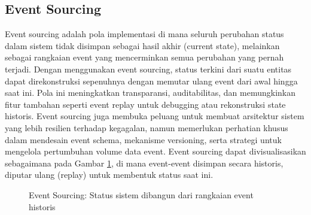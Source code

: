 \subsection{Event Sourcing}
Event sourcing adalah pola implementasi di mana seluruh perubahan status dalam sistem tidak disimpan sebagai hasil akhir (current state), melainkan sebagai rangkaian event yang mencerminkan semua perubahan yang pernah terjadi. Dengan menggunakan event sourcing, status terkini dari suatu entitas dapat direkonstruksi sepenuhnya dengan memutar ulang event dari awal hingga saat ini. Pola ini meningkatkan transparansi, auditabilitas, dan memungkinkan fitur tambahan seperti event replay untuk debugging atau rekonstruksi state historis. Event sourcing juga membuka peluang untuk membuat arsitektur sistem yang lebih resilien terhadap kegagalan, namun memerlukan perhatian khusus dalam mendesain event schema, mekanisme versioning, serta strategi untuk mengelola pertumbuhan volume data event. Event sourcing dapat divisualisasikan sebagaimana pada Gambar \ref{fig:event-sourcing}, di mana event-event disimpan secara historis, diputar ulang (replay) untuk membentuk status saat ini.

\begin{figure}[h]
	\centering
	\caption{Event Sourcing: Status sistem dibangun dari rangkaian event historis}
	\label{fig:event-sourcing}
\end{figure}



